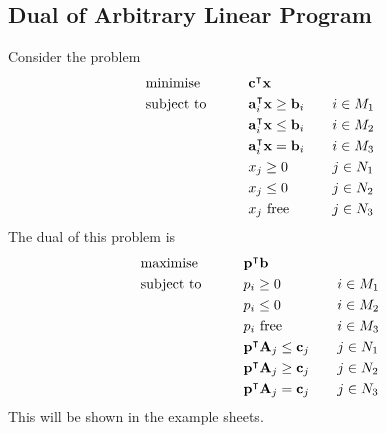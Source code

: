 \subsection{Dual of Arbitrary Linear Program}
Consider the problem
\begin{alignat*}{3}
    & \text{minimise} & \qquad & \vb c^\intercal \vb x    & & \\
    & \text{subject to}                             &        & \vb a_i^\intercal \vb x \geq \vb b_i & \quad & i \in M_1 \\
    & &        & \vb a_i^\intercal \vb x \leq \vb b_i &  & i \in M_2 \\
    & &        & \vb a_i^\intercal \vb x = \vb b_i &  & i \in M_3 \\
    & &        & x_j \geq 0 &  & j \in N_1 \\
    & &        & x_j \leq 0 &  & j \in N_2 \\
    & &        & x_j \text{ free} &  & j \in N_3 \\
\end{alignat*}
The dual of this problem is
\begin{alignat*}{3}
    & \text{maximise} & \qquad & \vb p^\intercal \vb b    & & \\
    & \text{subject to}                             &        & p_i \geq 0 & \quad & i \in M_1 \\
    & &        & p_i \leq 0 &  & i \in M_2 \\
    & &        & p_i \text{ free} &  & i \in M_3 \\
    & &        & \vb p^\intercal \vb A_j \leq \vb c_j &  & j \in N_1 \\
    & &        & \vb p^\intercal \vb A_j \geq \vb c_j &  & j \in N_2 \\
    & &        & \vb p^\intercal \vb A_j = \vb c_j &  & j \in N_3 \\
\end{alignat*}
This will be shown in the example sheets.

